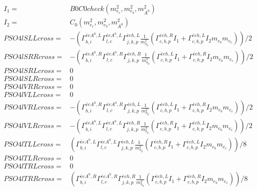 \documentclass[A4,landscape]{article}
\begin{document}
\begin{align} 
I_1= & B0C0check(m^2_{e_{{c}}}, m^2_{e_{{b}}}, m^2_{A^0}) \\ 
I_2= & C_0(m^2_{e_{{c}}}, m^2_{e_{{b}}}, m^2_{A^0}) \\ 
  PSO4lSLLcross= & -( \Gamma^{\bar{e}e A^0 ,L}_{b, i} \Gamma^{\bar{e}e A^0 ,L}_{l, c} \Gamma^{\bar{e}e h ,L}_{j, k, p} \frac{1}{m^2_{h_{{p}}}} (\Gamma^{\bar{e}e h ,R}_{c, b, p} I_1 + \Gamma^{\bar{e}e h ,L}_{c, b, p} I_2 m_{e_{{b}}} m_{e_{{c}}}))/2 \\ 
  PSO4lSRRcross= & -( \Gamma^{\bar{e}e A^0 ,R}_{b, i} \Gamma^{\bar{e}e A^0 ,R}_{l, c} \Gamma^{\bar{e}e h ,R}_{j, k, p} \frac{1}{m^2_{h_{{p}}}} (\Gamma^{\bar{e}e h ,L}_{c, b, p} I_1 + \Gamma^{\bar{e}e h ,R}_{c, b, p} I_2 m_{e_{{b}}} m_{e_{{c}}}))/2 \\ 
  PSO4lSRLcross= & 0 \\ 
  PSO4lSLRcross= & 0 \\ 
  PSO4lVRRcross= & 0 \\ 
  PSO4lVLLcross= & 0 \\ 
  PSO4lVRLcross= & -( \Gamma^{\bar{e}e A^0 ,R}_{b, i} \Gamma^{\bar{e}e A^0 ,R}_{l, c} \Gamma^{\bar{e}e h ,L}_{j, k, p} \frac{1}{m^2_{h_{{p}}}} (\Gamma^{\bar{e}e h ,L}_{c, b, p} I_1 + \Gamma^{\bar{e}e h ,R}_{c, b, p} I_2 m_{e_{{b}}} m_{e_{{c}}}))/2 \\ 
  PSO4lVLRcross= & -( \Gamma^{\bar{e}e A^0 ,L}_{b, i} \Gamma^{\bar{e}e A^0 ,L}_{l, c} \Gamma^{\bar{e}e h ,R}_{j, k, p} \frac{1}{m^2_{h_{{p}}}} (\Gamma^{\bar{e}e h ,R}_{c, b, p} I_1 + \Gamma^{\bar{e}e h ,L}_{c, b, p} I_2 m_{e_{{b}}} m_{e_{{c}}}))/2 \\ 
  PSO4lTLLcross= & ( \Gamma^{\bar{e}e A^0 ,L}_{b, i} \Gamma^{\bar{e}e A^0 ,L}_{l, c} \Gamma^{\bar{e}e h ,L}_{j, k, p} \frac{1}{m^2_{h_{{p}}}} (\Gamma^{\bar{e}e h ,R}_{c, b, p} I_1 + \Gamma^{\bar{e}e h ,L}_{c, b, p} I_2 m_{e_{{b}}} m_{e_{{c}}}))/8 \\ 
  PSO4lTLRcross= & 0 \\ 
  PSO4lTRLcross= & 0 \\ 
  PSO4lTRRcross= & ( \Gamma^{\bar{e}e A^0 ,R}_{b, i} \Gamma^{\bar{e}e A^0 ,R}_{l, c} \Gamma^{\bar{e}e h ,R}_{j, k, p} \frac{1}{m^2_{h_{{p}}}} (\Gamma^{\bar{e}e h ,L}_{c, b, p} I_1 + \Gamma^{\bar{e}e h ,R}_{c, b, p} I_2 m_{e_{{b}}} m_{e_{{c}}}))/8 \\ 
\end{align} 
\end{document}
